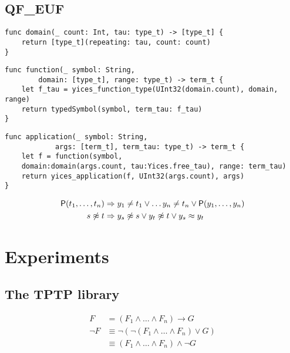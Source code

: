 \subsection{QF\_EUF}

\begin{lstlisting}[language=flea]
func domain(_ count: Int, tau: type_t) -> [type_t] {
	return [type_t](repeating: tau, count: count)
}
\end{lstlisting}

\begin{lstlisting}[language=flea]
func function(_ symbol: String, 
		domain: [type_t], range: type_t) -> term_t {
	let f_tau = yices_function_type(UInt32(domain.count), domain, range)
	return typedSymbol(symbol, term_tau: f_tau)
}
\end{lstlisting}

\begin{lstlisting}[language=flea]
func application(_ symbol: String, 
			args: [term_t], term_tau: type_t) -> term_t {
	let f = function(symbol, 
	domain:domain(args.count, tau:Yices.free_tau), range: term_tau)
	return yices_application(f, UInt32(args.count), args)
}
\end{lstlisting}


\begin{definition}
	
	\end{definition}

\begin{example}
	\begin{align*}
	{\mathsf P}(t_1,\ldots, t_n) &\Rightarrow y_1\neq t_1 \lor \ldots y_n\neq t_n \lor {\mathsf P}(y_1,\ldots,y_n) \\
	s \not\approx t &\Rightarrow y_s\not\approx s\lor y_t\not\approx t \lor y_s \approx y_t \\
	\end{align*}
	\end{example}







\section{Experiments}

\subsection{The TPTP library}

\begin{align*}
F 
&=
(F_1 \land \ldots \land F_n) \rightarrow G
\\
\lnot F 
&\equiv
\lnot\left( \lnot(F_1 \land \ldots \land F_n) \lor G \right)
\\
&\equiv 
(F_1 \land \ldots \land F_n) \land \lnot G
\end{align*}

